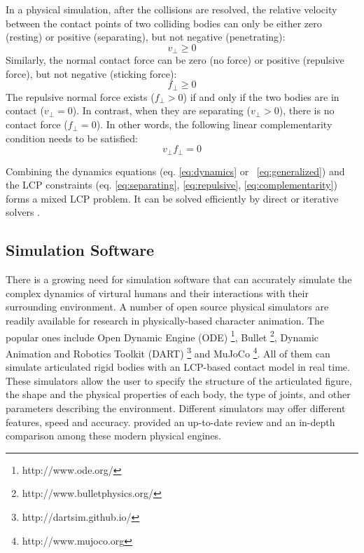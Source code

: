 In a physical simulation, after the collisions are resolved, the relative velocity between the contact points of two colliding bodies can only be either zero (resting) or positive (separating), but not negative (penetrating):
\begin{equation}
v_\perp\geq 0
\label{eq:separating}
\end{equation}
Similarly, the normal contact force can be zero (no force) or positive (repulsive force), but not negative (sticking force):
\begin{equation}
f_\perp \geq 0
\label{eq:repulsive}
\end{equation}
The repulsive normal force exists ($f_\perp>0$) if and only if the two bodies are in contact ($v_\perp=0$). In contrast, when they are separating ($v_\perp>0$), there is no contact force ($f_\perp=0$).
In other words, the following linear complementarity condition needs to be satisfied:
\begin{equation}
v_\perp f_\perp =0
\label{eq:complementarity}
\end{equation}

Combining the dynamics equations (eq. \ref{eq:dynamics} or ~\ref{eq:generalized}) and the LCP constraints (eq. \ref{eq:separating}, \ref{eq:repulsive}, \ref{eq:complementarity}) forms a mixed LCP problem. It can be solved efficiently by direct \cite{Lloyd:2005} or iterative solvers \cite{Erleben:2007,Kaufman:2008,Otaduy:2009}. 


\subsection{Simulation Software}

There is a growing need for simulation software that can accurately simulate the complex dynamics of virtural humans and their interactions with their surrounding environment. A number of open source physical simulators are readily available for research in physically-based character animation. The popular ones include Open Dynamic Engine (ODE) \footnote{http://www.ode.org/}, Bullet \footnote{http://www.bulletphysics.org/}, Dynamic Animation and Robotics Toolkit (DART) \footnote{http://dartsim.github.io/} and MuJoCo \footnote{http://www.mujoco.org}. All of them can simulate articulated rigid bodies with an LCP-based contact model in real time. These simulators allow the user to specify the structure of the articulated figure, the shape and the physical properties of each body, the type of joints, and other parameters describing the environment. Different simulators may offer different features, speed and accuracy. \citet{ErezTT15} provided an up-to-date review and an in-depth comparison among these modern physical engines.
